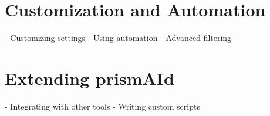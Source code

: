\chapter{Customization and Automation} \label{chap:advanced}
- Customizing settings  
- Using automation  
- Advanced filtering  

\chapter{Extending prismAId} \label{chap:extending}
- Integrating with other tools  
- Writing custom scripts  